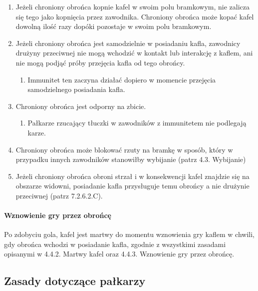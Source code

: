 \documentclass[12pt]{article}
\begin{document}
\begin{enumerate}
	\item
	      Jeżeli chroniony obrońca kopnie kafel w swoim polu bramkowym, nie
	      zalicza się tego jako kopnięcia przez zawodnika. Chroniony obrońca
	      może kopać kafel dowolną ilość razy dopóki pozostaje w swoim polu
	      bramkowym.
	\item
	      Jeżeli chroniony obrońca jest samodzielnie w posiadaniu kafla,
	      zawodnicy drużyny przeciwnej nie mogą wchodzić w kontakt lub
	      interakcję z kaflem, ani nie mogą podjąć próby przejęcia kafla od tego
	      obrońcy.

	      \begin{enumerate}
		      \item
		            Immunitet ten zaczyna działać dopiero w momencie przejęcia
		            samodzielnego posiadania kafla.
	      \end{enumerate}
	\item
	      Chroniony obrońca jest odporny na zbicie.

	      \begin{enumerate}
		      \item
		            Pałkarze rzucający tłuczki w zawodników z immunitetem nie podlegają
		            karze.
	      \end{enumerate}
	\item
	      Chroniony obrońca może blokować rzuty na bramkę w sposób, który w
	      przypadku innych zawodników stanowiłby wybijanie (patrz 4.3.
	      Wybijanie)
	\item
	      Jeżeli chroniony obrońca obroni strzał i w konsekwencji kafel znajdzie
	      się na obszarze widowni, posiadanie kafla przysługuje temu obrońcy a
	      nie drużynie przeciwnej (patrz 7.2.6.2.C).
\end{enumerate}

\paragraph{Wznowienie gry przez obrońcę}
Po zdobyciu gola, kafel
jest martwy do momentu wznowienia gry kaflem w chwili, gdy obrońca
wchodzi w posiadanie kafla, zgodnie z wszystkimi zasadami opisanymi w
4.4.2. Martwy kafel oraz 4.4.3. Wznowienie gry przez obrońcę.

\subsection{Zasady dotyczące pałkarzy}
\end{document}
